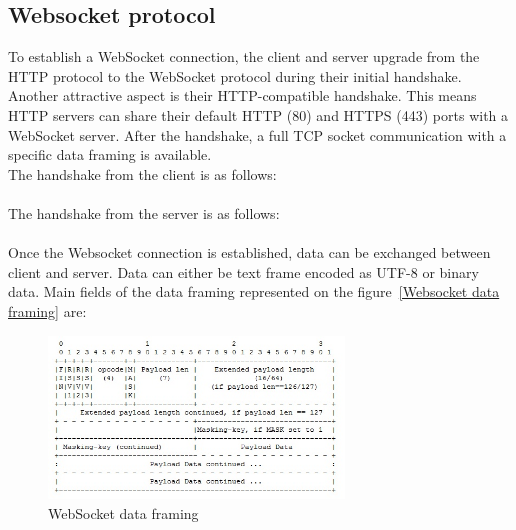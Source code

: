 \documentclass[pdftex,10pt,a4paper]{report}
\begin{document}
\subsection{Websocket protocol}

To establish a WebSocket connection, the client and server upgrade from the HTTP protocol to the WebSocket protocol during their initial handshake. Another attractive aspect is their HTTP-compatible handshake. This means HTTP servers can share their default HTTP (80) and HTTPS (443) ports with a WebSocket server. After the handshake, a full TCP socket communication with a specific data framing is available. \\

The handshake from the client is as follows: \\

\\


The handshake from the server is as follows: \\

 \\


Once the Websocket connection is established, data can be exchanged between client and server. Data can either be text frame encoded as UTF-8 or binary data. Main fields of the data framing represented on the figure~\ref{Websocket data framing} are:

\begin{figure}[h!]
		\centering
		\includegraphics[width=0.7\textwidth]{./frame_ws.jpg}
		\caption{WebSocket data framing}
		\label{WebSocket data framing}
\end{figure}
\end{document}

